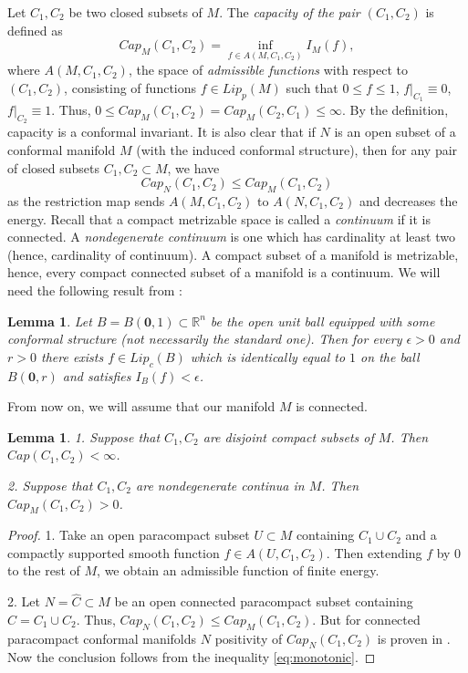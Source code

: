 \documentclass[11pt]{article}   	%
\newtheorem{lem}[thm]{Lemma}
\def\eps{\epsilon}
\def\R{\mathbb R}
\begin{document}
Let $C_1, C_2$ be two closed subsets of $M$. The {\em capacity of the pair $(C_1, C_2)$} is defined as
$$
Cap_M(C_1,C_2)=\inf_{f\in A(M,C_1,C_2)} I_M(f),
$$
where $A(M,C_1,C_2)$, the space of {\em admissible functions} with respect to $(C_1, C_2)$, consisting of functions $f\in Lip_p(M)$ such that $0\le f\le 1$, 
$f|_{C_1}\equiv 0$, $f|_{C_2}\equiv 1$. Thus, $0\le Cap_M(C_1,C_2)=Cap_M(C_2, C_1)\le \infty$. By the definition, capacity is a conformal invariant. 
It is also clear that if $N$ is an open subset of a conformal manifold $M$ (with the induced conformal structure), then for any pair of closed subsets 
$C_1, C_2\subset M$, we have
\begin{equation}\label{eq:monotonic}
Cap_N(C_1,C_2)\le Cap_M(C_1,C_2)
\end{equation}
as the restriction map sends  $A(M,C_1,C_2)$ to $A(N,C_1,C_2)$ and decreases the energy. Recall that a compact metrizable space is  called 
a {\em continuum} if it is connected. A {\em nondegenerate continuum} is one which has cardinality at least two (hence, cardinality of continuum). 
A compact subset of a manifold is metrizable, hence, every compact connected subset of a manifold is a continuum. 
We will need the following result from \cite[(1.3)]{Ferrand}: 

\begin{lem}\label{lem:L0}
Let $B=B(\mathbf 0, 1)\subset \R^n$ be the open unit ball equipped with some conformal structure (not necessarily the standard one). 
Then for every $\eps>0$ and $r>0$ there exists 
$f\in Lip_c(B)$ which is identically equal to $1$ on the ball $B(\mathbf 0, r)$ and satisfies $I_B(f)<\eps$.  
\end{lem}

From now on, we will assume that our manifold $M$ is connected. 




\begin{lem}\label{lem:L2}
1. Suppose that $C_1, C_2$ are disjoint compact subsets of $M$. Then $Cap(C_1, C_2)<\infty$. 

2. Suppose that $C_1, C_2$ are nondegenerate continua in $M$. Then $Cap_M(C_1,C_2)>0$. 
\end{lem}
\begin{proof} 1. Take an open paracompact subset $U\subset M$ containing $C_1\cup C_2$ and a compactly supported smooth function $f\in A(U, C_1, C_2)$. Then 
extending $f$ by $0$ to the rest of $M$, we obtain an admissible function of finite energy.  

2. Let $N=\hat C\subset M$ be an open connected paracompact subset containing $C=C_1\cup C_2$. Thus, $Cap_N(C_1,C_2)\le Cap_M(C_1,C_2)$. 
But for connected paracompact conformal manifolds $N$ positivity of $Cap_N(C_1,C_2)$ is proven in \cite[(3.6)]{Ferrand}. Now the conclusion follows from the inequality 
\eqref{eq:monotonic}. \end{proof}
\end{document}
